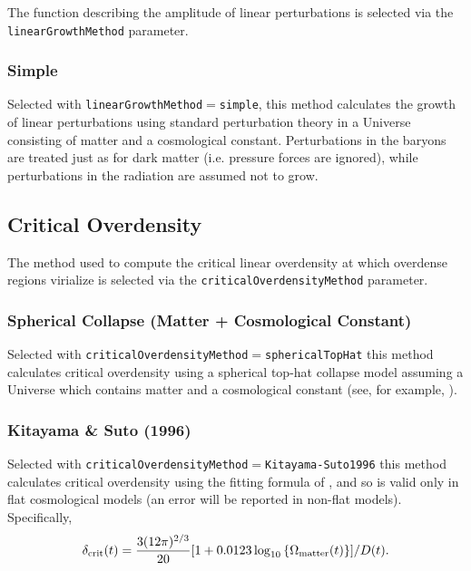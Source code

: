 The function describing the amplitude of linear perturbations is selected via the {\tt linearGrowthMethod} parameter.

\subsubsection{Simple}

Selected with {\tt linearGrowthMethod}$=${\tt simple}, this method calculates the growth of linear perturbations using standard perturbation theory in a Universe consisting of matter and a cosmological constant. Perturbations in the baryons are treated just as for dark matter (i.e. pressure forces are ignored), while perturbations in the radiation are assumed not to grow.

\subsection{Critical Overdensity}\label{sec:criticalOverdensityMethod}

The method used to compute the critical linear overdensity at which overdense regions virialize is selected via the {\tt criticalOverdensityMethod} parameter.

\subsubsection{Spherical Collapse (Matter + Cosmological Constant)}

Selected with {\tt criticalOverdensityMethod}$=${\tt sphericalTopHat} this method calculates critical overdensity using a spherical top-hat collapse model assuming a Universe which contains matter and a cosmological constant (see, for example, \citealt{percival_cosmological_2005}).

\subsubsection{Kitayama \& Suto (1996)}

Selected with {\tt criticalOverdensityMethod}$=${\tt Kitayama-Suto1996} this method calculates critical overdensity using the fitting formula of \cite{kitayama_semianalytic_1996}, and so is valid only in flat cosmological models (an error will be reported in non-flat models). Specifically,
\begin{equation}
 \delta_{\rm crit} (t) = {3 (12 \pi)^{2/3} \over 20} [1 + 0.0123 \log_{10}\left\{\Omega_{\rm matter}(t)\right\}]/D(t).
\end{equation}


